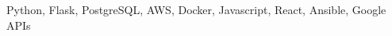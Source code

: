 


\begin{cventries}


\cventry
{} %
{}
{}
{}
{%
\begin{cvitems}
\item {Python, Flask, PostgreSQL, AWS, Docker, Javascript, React, Ansible, Google APIs} %
\end{cvitems}
}


\end{cventries}
